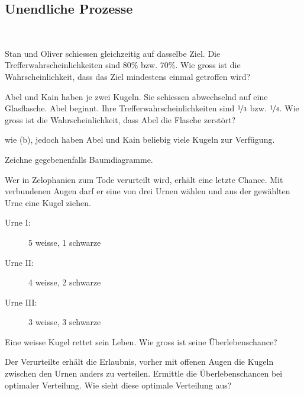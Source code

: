 \documentclass[%
11pt,%
twoside,%
titlepage,%
german,%
headsepline%
]{scrartcl}
\begin{document}
\subsection{Unendliche Prozesse}

\begin{ueb}
\ \\[-4ex]
\begin{enumeratea}
\item Stan und Oliver schiessen gleichzeitig auf dasselbe Ziel. Die Trefferwahrscheinlichkeiten sind 80\% bzw. 70\%. Wie gross ist die Wahrscheinlichkeit, dass das Ziel mindestens einmal getroffen wird?
\item Abel und Kain haben je zwei Kugeln. Sie schiessen abwechselnd auf eine Glasflasche. Abel beginnt. Ihre Trefferwahrscheinlichkeiten sind $\nicefrac{1}{3}$ bzw. $\nicefrac{1}{4}$. Wie gross ist die Wahrscheinlichkeit, dass Abel die Flasche zerstört?
\item wie (b), jedoch haben Abel und Kain beliebig viele Kugeln zur Verfügung.
\end{enumeratea}

Zeichne gegebenenfalls Baumdiagramme.
\end{ueb}

\begin{ueb}
Wer in Zelophanien zum Tode verurteilt wird, erhält eine letzte Chance. Mit verbundenen Augen darf er eine von drei Urnen wählen und aus der gewählten Urne eine Kugel ziehen.
\begin{description}
\item[Urne I:] 5 weisse, 1 schwarze
\item[Urne II:] 4 weisse, 2 schwarze
\item[Urne III:] 3 weisse, 3 schwarze
\end{description}
\begin{enumeratea}
\item Eine weisse Kugel rettet sein Leben. Wie gross ist
seine Überlebenschance?
\item Der Verurteilte erhält die Erlaubnis, vorher mit
offenen Augen die Kugeln zwischen den Urnen anders zu verteilen. Ermittle die Überlebenschancen bei optimaler Verteilung. Wie sieht diese optimale Verteilung aus?
\end{enumeratea}
\end{ueb}
\end{document}
